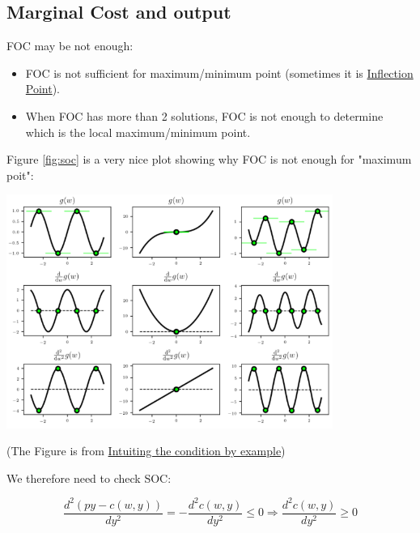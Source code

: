 \documentclass{article}
\begin{document}
\subsection{Marginal Cost and output}

\begin{mdframed}[backgroundcolor=blue!20,linecolor=white]

FOC may be not enough:

\begin{itemize}
\item FOC is not sufficient for maximum/minimum point (sometimes it is \href{https://en.wikipedia.org/wiki/Inflection_point}{Inflection Point}).
\item When FOC has more than 2 solutions, FOC is not enough to determine which is the local maximum/minimum point.
\end{itemize}

\vspace{2mm}

Figure \ref{fig:soc} is a very nice plot showing why FOC is not enough for "maximum poit":

\vspace{2mm}
{\centering
\includegraphics[width=0.8\textwidth]{5.soc}
\label{fig:soc}}
\vspace{2mm}

(The Figure is from \href{https://kenndanielso.github.io/mlrefined/blog_posts/7_Second_order_methods/7_8_Second_order_condition.html}{Intuiting the condition by example})

\vspace{3mm}

We therefore need to check SOC:

$$\frac{d^2(py - c(w,y))}{dy^2} = - \frac{d^2c(w,y)}{dy^2} \le 0 \Rightarrow \frac{d^2c(w,y)}{dy^2} \ge 0$$


\end{mdframed}
\end{document}
